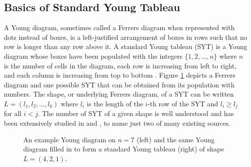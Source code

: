 \documentclass[article]{amsart}
\theoremstyle{plain}
\theoremstyle{definition}
\begin{document}
\subsection{Basics of Standard Young Tableau} \label{sub:SYT_basics}

A Young diagram, sometimes called a Ferrers diagram when represented with dots instead of boxes, is a left-justified arrangement of boxes in rows such that no row is longer than any row above it. A standard Young tableau (SYT) is a Young diagram whose boxes have been populated with the integers $\{1, 2, \dots, n\}$ where $n$ is the number of cells in the diagram, each row is increasing from left to right, and each column is increasing from top to bottom \cite{zeil}. Figure \ref{fig:ferrers&syt} depicts a Ferrers diagram and one possible SYT that can be obtained from its population with numbers. The shape, or underlying Ferrers diagram, of a SYT can be written $L = (l_1, l_2, \dots, l_k)$ where $l_i$ is the length of the $i$-th row of the SYT and $l_i \geq l_j$ for all $i < j$. The number of SYT of a given shape is well understood and has been extensively studied in \cite{stanley} and \cite{zeil}, to name just two of many existing sources.

\begin{figure}[h!] 
\centering

\caption{An example Young diagram on $n=7$ (left) and the same Young diagram filled in to form a standard Young tableau (right) of shape $L=(4,2,1)$.}
\label{fig:ferrers&syt}
\end{figure}
\end{document}
